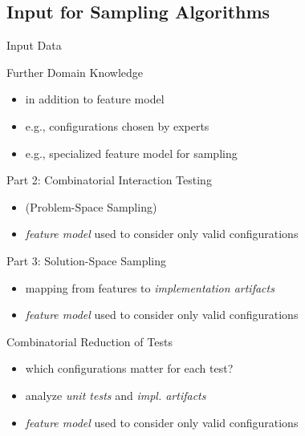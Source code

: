 \subsection{Input for Sampling Algorithms}
\begin{frame}{\myframetitle{}}
	\begin{mycolumns}
		\begin{definition}{Input Data \mysource{\samplingsurvey}}
		\end{definition}
		\pause
		\begin{example}{Further Domain Knowledge \mysource{\samplingsurvey}}
			\begin{itemize}
				\item in addition to feature model
				\item e.g., configurations chosen by experts
				\item e.g., specialized feature model for sampling
			\end{itemize}
		\end{example}
	\mynextcolumn
		\pause
		\vspace{-5mm}
		\begin{example}{Part 2: Combinatorial Interaction Testing}
			\begin{itemize}
				\item (Problem-Space Sampling)
				\item \emph{feature model} used to consider only valid configurations
			\end{itemize}
		\end{example}
		\pause
		\begin{example}{Part 3: Solution-Space Sampling}
			\begin{itemize}
				\item mapping from features to \emph{implementation artifacts}
				\item \emph{feature model} used to consider only valid configurations
			\end{itemize}
		\end{example}
		\pause
		\begin{example}{Combinatorial Reduction of Tests \mysource{\reducingconfigurations}}
			\begin{itemize}
				\item which configurations matter for each test?
				\item analyze \emph{unit tests} and \emph{impl. artifacts}
				\item \emph{feature model} used to consider only valid configurations
			\end{itemize}
		\end{example}
	\end{mycolumns}
\end{frame}
